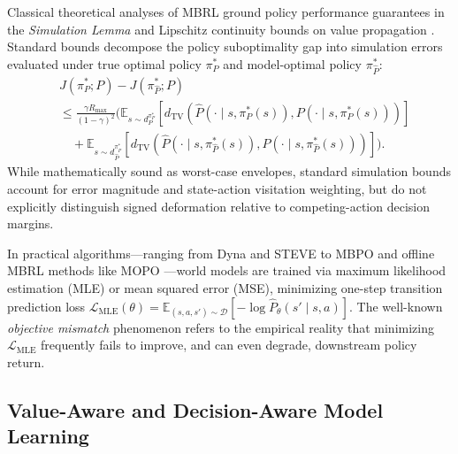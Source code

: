 \documentclass[journal,10pt,twocolumn]{IEEEtran}
\begin{document}
Classical theoretical analyses of MBRL ground policy performance guarantees in the \emph{Simulation Lemma} \cite{kearns2002near, kakade2002approximately, luo2018algorithmic, pires2016policy} and Lipschitz continuity bounds on value propagation \cite{asadi2018lipschitz}. Standard bounds decompose the policy suboptimality gap into simulation errors evaluated under true optimal policy $\pi_P^*$ and model-optimal policy $\pi_{\hat{P}}^*$:
\begin{align}
&J\left(\pi_P^*; P\right) - J\left(\pi_{\hat{P}}^*; P\right) \nonumber \\
&\le \frac{\gamma R_{\max}}{(1-\gamma)^2} \Biggl( \mathbb{E}_{s \sim d_P^{\pi_P^*}}\!\left[ d_{\mathrm{TV}}\!\left(\hat{P}(\cdot \mid s, \pi_P^*(s)), P(\cdot \mid s, \pi_P^*(s))\right) \right] \nonumber \\
&\quad + \mathbb{E}_{s \sim d_{\hat{P}}^{\pi_{\hat{P}}^*}}\!\left[ d_{\mathrm{TV}}\!\left(\hat{P}(\cdot \mid s, \pi_{\hat{P}}^*(s)), P(\cdot \mid s, \pi_{\hat{P}}^*(s))\right) \right] \Biggr).
\label{eq:simulation_lemma_bound}
\end{align}
While mathematically sound as worst-case envelopes, standard simulation bounds account for error magnitude and state-action visitation weighting, but do not explicitly distinguish signed deformation relative to competing-action decision margins.

In practical algorithms---ranging from Dyna \cite{sutton1990integrated} and STEVE \cite{buckman2018sample} to MBPO \cite{janner2019trust} and offline MBRL methods like MOPO \cite{yu2020mopo}---world models are trained via maximum likelihood estimation (MLE) or mean squared error (MSE), minimizing one-step transition prediction loss $\mathcal{L}_{\mathrm{MLE}}(\theta) = \mathbb{E}_{(s, a, s') \sim \mathcal{D}}[ -\log \hat{P}_\theta(s' \mid s, a) ]$.
The well-known \emph{objective mismatch} phenomenon \cite{farahmand2017value, lambert2020objective, wei2023unified} refers to the empirical reality that minimizing $\mathcal{L}_{\mathrm{MLE}}$ frequently fails to improve, and can even degrade, downstream policy return. 

\subsection{Value-Aware and Decision-Aware Model Learning}
\label{subsec:value_aware_models}
\end{document}

